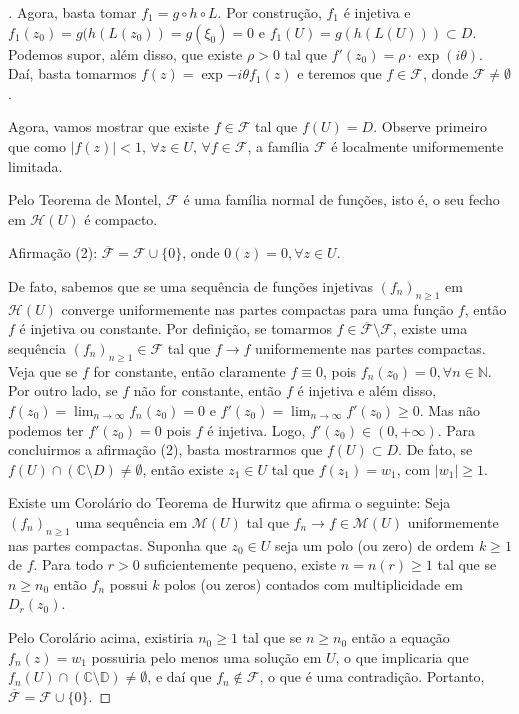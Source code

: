 \begin{proof}[]
Agora, basta tomar $f_1=g\circ h\circ L$. Por construção, $f_1$ é injetiva e $f_1(z_0) = g(h(L(z_0)) = g(\xi_0) = 0$ e $f_1(U) = g(h(L(U)))\subset D$. Podemos supor, além disso, que existe $\rho>0$ tal que $f'(z_0)=\rho\cdot\exp{(i\theta)}$. Daí, basta tomarmos $f(z)=\exp{-i\theta}f_1(z)$ e teremos que $f\in\mathcal{F}$, donde $\mathcal{F}\neq\emptyset$.

Agora, vamos mostrar que existe $f\in\mathcal{F}$ tal que $f(U) = D$. Observe primeiro que como $|f(z)|<1,\,\forall z\in U,\,\forall f\in\mathcal{F}$, a família $\mathcal{F}$ é localmente uniformemente limitada.

Pelo Teorema de Montel, $\mathcal{F}$ é uma família normal de funções, isto é, o seu fecho em $\mathcal{H}(U)$ é compacto.

Afirmação (2): $\overline{\mathcal{F}} = \mathcal{F}\cup \{0\}$, onde $0(z)=0, \forall z\in U$. 

De fato, sabemos que se uma sequência de funções injetivas $(f_n)_{n\geq 1}$ em $\mathcal{H}(U)$ converge uniformemente nas partes compactas para uma função $f$, então $f$ é injetiva ou constante. Por definição, se tomarmos $f\in\overline{\mathcal{F}}\setminus\mathcal{F}$, existe uma sequência $(f_n)_{n\geq 1}\in\mathcal{F}$ tal que $f\longrightarrow f$ uniformemente nas partes compactas. Veja que se $f$ for constante, então claramente $f\equiv 0$, pois $f_n(z_0)=0,\forall n\in\mathbb{N}$. Por outro lado, se $f$ não for constante, então $f$ é injetiva e além disso, $f(z_0)=\displaystyle\lim_{n\to\infty}f_n(z_0)=0$ e $f'(z_0)=\displaystyle\lim_{n\to\infty}f'(z_0)\geq 0$. Mas não podemos ter $f'(z_0)=0$ pois $f$ é injetiva. Logo, $f'(z_0)\in(0,+\infty)$. Para concluirmos a afirmação (2), basta mostrarmos que $f(U)\subset D$. De fato, se $f(U)\cap(\mathbb{C}\setminus D)\neq\emptyset$, então existe $z_1\in U$ tal que $f(z_1)=w_1$, com $|w_1|\geq 1$. 

Existe um Corolário do Teorema de Hurwitz que afirma o seguinte: Seja $(f_n)_{n\geq 1}$ uma sequência em $\mathcal{M}(U)$ tal que $f_n\longrightarrow f\in\mathcal{M}(U)$ uniformemente nas partes compactas. Suponha que $z_0\in U$ seja um polo (ou zero) de ordem $k\geq 1$ de $f$. Para todo $r>0$ suficientemente pequeno, existe $n=n(r)\geq 1$ tal que se $n\geq n_0$ então $f_n$ possui $k$ polos (ou zeros) contados com multiplicidade em $D_r(z_0)$. 

Pelo Corolário acima, existiria $n_0\geq 1$ tal que se $n\geq n_0$ então a equação $f_n(z)=w_1$ possuiria pelo menos uma solução em $U$, o que implicaria que $f_n(U)\cap(\mathbb{C\setminus D})\neq\emptyset$, e daí que $f_n\notin\mathcal{F}$, o que é uma contradição. Portanto, $\overline{\mathcal{F}}=\mathcal{F}\cup\{0\}$.


\end{proof}
